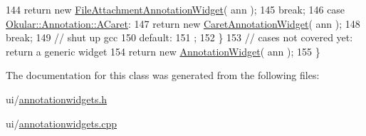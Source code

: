 \begin{DoxyCode}
144             \textcolor{keywordflow}{return} \textcolor{keyword}{new} \hyperlink{classFileAttachmentAnnotationWidget}{FileAttachmentAnnotationWidget}( ann );
145             \textcolor{keywordflow}{break};
146         \textcolor{keywordflow}{case} \hyperlink{classOkular_1_1Annotation_af71b46e37d5f850b97d5c4de3be9aac0a904187454fd508d898a3d5843193ad43}{Okular::Annotation::ACaret}:
147             \textcolor{keywordflow}{return} \textcolor{keyword}{new} \hyperlink{classCaretAnnotationWidget}{CaretAnnotationWidget}( ann );
148             \textcolor{keywordflow}{break};
149         \textcolor{comment}{// shut up gcc}
150         \textcolor{keywordflow}{default}:
151             ;
152     \}
153     \textcolor{comment}{// cases not covered yet: return a generic widget}
154     \textcolor{keywordflow}{return} \textcolor{keyword}{new} \hyperlink{classAnnotationWidget}{AnnotationWidget}( ann );
155 \}
\end{DoxyCode}


The documentation for this class was generated from the following files\+:\begin{DoxyCompactItemize}
\item 
ui/\hyperlink{annotationwidgets_8h}{annotationwidgets.\+h}\item 
ui/\hyperlink{annotationwidgets_8cpp}{annotationwidgets.\+cpp}\end{DoxyCompactItemize}
